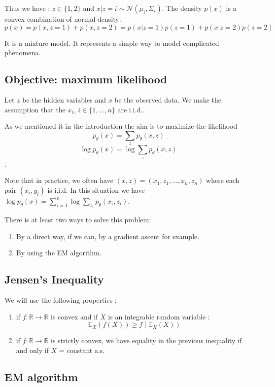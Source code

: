 \documentclass[12pt]{report}
\begin{document}
Thus we have : $z\in\{1,2\}$ and $x|z = i \sim
\mathcal{N}(\mu_i,\Sigma_i)$. The density $p(x)$ is a convex combination of normal density:
$$p(x)=p(x,z=1)+p(x,z=2)=p(x|z=1)p(z=1)+p(x|z=2)p(z=2)$$

It is a mixture model. It represents a simple way to model complicated phenomena. 

\subsection{Objective: maximum likelihood}

Let $z$  be the hidden variables and $x$ be the observed data. We make the assumption that the $x_i$, $i\in\{1,...,n\}$ are i.i.d..

As we mentioned it in the introduction the aim is to maximize the likelihood
$$p_{\theta}(x)= \sum_{z}p_{\theta}(x,z)$$
$$\log p_{\theta}(x)= \log \sum_{z}p_{\theta}(x,z)$$.

Note that in practice, we often have $(x,z) = (x_1,z_1,\dots,x_n,z_n)$ where each pair $(x_i,y_i)$ is i.i.d. In this situation we have
$\log p_{\theta}(x)= \sum_{i=1}^n \log \sum_{z_i} p_{\theta}(x_i,z_i)$.

There is at least two ways to solve this problem:
\begin{enumerate}
\item By a direct way, if we can, by a gradient ascent for example.
\item By using the EM algorithm.
\end{enumerate}

\subsection{Jensen's Inequality}
We will use the following properties :
\begin{enumerate}
\item if $f:\mathbb{R} \rightarrow \mathbb{R}$ is convex and if $X$ is an integrable random variable  :
  $$\mathbb{E}_X(f(X))\geq f(\mathbb{E}_X(X))$$
\item if $f:\mathbb{R} \rightarrow \mathbb{R}$ is strictly convex, we have equality in the previous inequality if and only if 
 $X$ = constant a.s.
\end{enumerate}

\subsection{EM algorithm}
\end{document}
